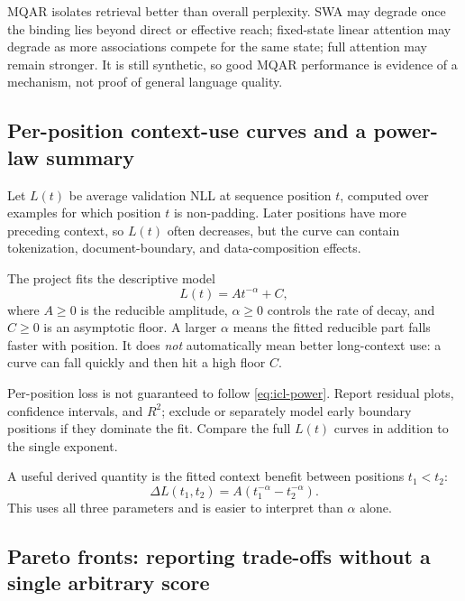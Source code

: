 \documentclass[11pt,a4paper]{article}
\theoremstyle{definition}
\theoremstyle{plain}
\begin{document}
MQAR isolates retrieval better than overall perplexity. SWA may degrade once the binding lies beyond direct or effective reach; fixed-state linear attention may degrade as more associations compete for the same state; full attention may remain stronger. It is still synthetic, so good MQAR performance is evidence of a mechanism, not proof of general language quality.

\subsection{Per-position context-use curves and a power-law summary}
\label{sec:icl-decay}

Let $L(t)$ be average validation NLL at sequence position $t$, computed over examples for which position $t$ is non-padding. Later positions have more preceding context, so $L(t)$ often decreases, but the curve can contain tokenization, document-boundary, and data-composition effects.

The project fits the descriptive model
\begin{equation}\label{eq:icl-power}
    L(t)=A t^{-\alpha}+C,
\end{equation}
where $A\geq0$ is the reducible amplitude, $\alpha\geq0$ controls the rate of decay, and $C\geq0$ is an asymptotic floor. A larger $\alpha$ means the fitted reducible part falls faster with position. It does \emph{not} automatically mean better long-context use: a curve can fall quickly and then hit a high floor $C$.

\begin{warningbox}
Per-position loss is not guaranteed to follow \cref{eq:icl-power}. Report residual plots, confidence intervals, and $R^2$; exclude or separately model early boundary positions if they dominate the fit. Compare the full $L(t)$ curves in addition to the single exponent.
\end{warningbox}

A useful derived quantity is the fitted context benefit between positions $t_1<t_2$:
\begin{equation}
    \Delta L(t_1,t_2)
    =A(t_1^{-\alpha}-t_2^{-\alpha}).
\end{equation}
This uses all three parameters and is easier to interpret than $\alpha$ alone.

\subsection{Pareto fronts: reporting trade-offs without a single arbitrary score}
\label{sec:pareto}
\end{document}
